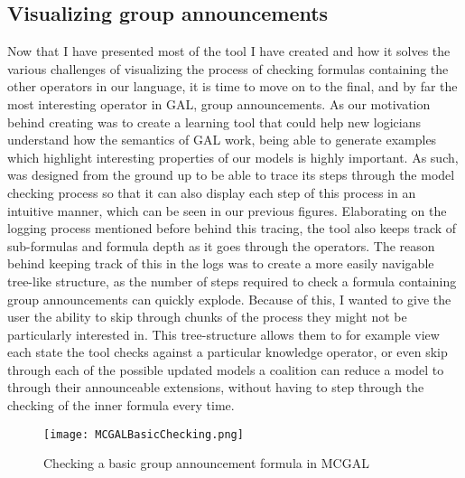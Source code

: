 \subsection{Visualizing group announcements}

Now that I have presented most of the tool I have created and how it solves the various challenges of visualizing the process of checking formulas containing the other operators in our language, it is time to move on to the final, and by far the most interesting operator in GAL, group announcements. As our motivation behind creating \cname{} was to create a learning tool that could help new logicians understand how the semantics of GAL work, being able to generate examples which highlight interesting properties of our models is highly important. As such, \cname{} was designed from the ground up to be able to trace its steps through the model checking process so that it can also display each step of this process in an intuitive manner, which can be seen in our previous figures. Elaborating on the logging process mentioned before behind this tracing, the tool also keeps track of sub-formulas and formula depth as it goes through the operators. The reason behind keeping track of this in the logs was to create a more easily navigable tree-like structure, as the number of steps required to check a formula containing group announcements can quickly explode. Because of this, I wanted to give the user the ability to skip through chunks of the process they might not be particularly interested in. This tree-structure allows them to for example view each state the tool checks against a particular knowledge operator, or even skip through each of the possible updated models a coalition can reduce a model to through their announceable extensions, without having to step through the checking of the inner formula every time. 
 
\begin{figure}[]
	\label{fig:basicGalChecking}
	\caption{Checking a basic group announcement formula in MCGAL}
	\texttt{[image: MCGALBasicChecking.png]}
\end{figure}


